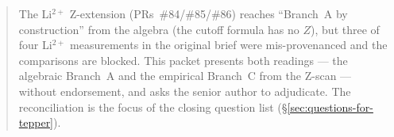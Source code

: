 \begin{abstract}
\bigskip

\noindent The Li$^{2+}$ Z-extension (PRs~\#84/\#85/\#86) reaches
``Branch~A by construction'' from the algebra (the cutoff formula has no $Z$),
but three of four Li$^{2+}$ measurements in the original brief were
mis-provenanced and the comparisons are blocked. This packet presents both
readings --- the algebraic Branch~A and the empirical Branch~C from the
Z-scan --- without endorsement, and asks the senior author to adjudicate.
The reconciliation is the focus of the closing question list
(\S\ref{sec:questions-for-tepper}).
\end{abstract}
